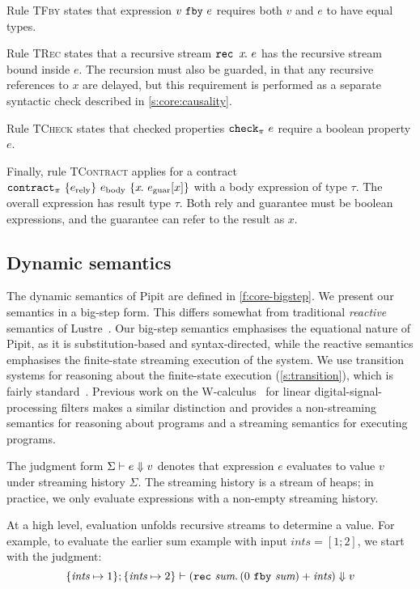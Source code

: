 Rule \textsc{TFby} states that expression $v~\texttt{fby}~e$ requires both $v$ and $e$ to have equal types.

Rule \textsc{TRec} states that a recursive stream $\texttt{rec~} x\hspace{-0.1em}.~e$ has the recursive stream bound inside $e$.
The recursion must also be guarded, in that any recursive references to $x$ are delayed, but this requirement is performed as a separate syntactic check described in \autoref{s:core:causality}.

Rule \textsc{TCheck} states that checked properties $\texttt{check}_{\pi}~e$ require a boolean property $e$.

Finally, rule \textsc{TContract} applies for a contract $\texttt{contract}_{\pi}~\{e_{\text{rely}}\}~e_{\text{body}}~\{x\hspace{-0.1em}.~e_{\text{guar}}[x]\}$ with a body expression of type $\tau$.
The overall expression has result type $\tau$.
Both rely and guarantee must be boolean expressions, and the guarantee can refer to the result as $x$.

\subsection{Dynamic semantics}
\label{s:core:dynamic}


The dynamic semantics of Pipit are defined in \autoref{f:core-bigstep}.
We present our semantics in a big-step form.
This differs somewhat from traditional \emph{reactive} semantics of Lustre~\cite{caspi1995functional}.
Our big-step semantics emphasises the equational nature of Pipit, as it is substitution-based and syntax-directed, while the reactive semantics emphasises the finite-state streaming execution of the system.
We use transition systems for reasoning about the finite-state execution (\autoref{s:transition}), which is fairly standard~\cite{brun2023equation,champion2016kind2,raymond2008synchronous}.
Previous work on the {\sc W-calculus}~\cite{gallego2021w} for linear digital-signal-processing filters makes a similar distinction and provides a non-streaming semantics for reasoning about programs and a streaming semantics for executing programs.


The judgment form $\Sigma \vdash e \Downarrow v$ denotes that expression $e$ evaluates to value $v$ under streaming history $\Sigma$.
The streaming history is a stream of heaps; in practice, we only evaluate expressions with a non-empty streaming history.

At a high level, evaluation unfolds recursive streams to determine a value.
For example, to evaluate the earlier sum example with input $\textit{ints} = [1; 2]$, we start with the judgment:
$$
\{ \textit{ints} \mapsto 1 \}; \{ \textit{ints} \mapsto 2 \} \vdash (\texttt{rec}~\textit{sum}.\, (0~\texttt{fby}~\textit{sum}) + \textit{ints}) \Downarrow v
$$

